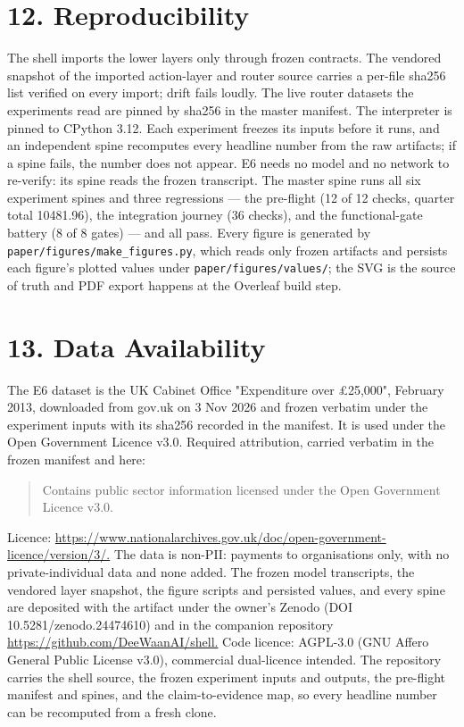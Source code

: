 \documentclass[11pt,a4paper]{article}
\begin{document}
\section*{12. Reproducibility}
The shell imports the lower layers only through frozen contracts. The vendored snapshot of the imported action-layer and router source carries a per-file sha256 list verified on every import; drift fails loudly. The live router datasets the experiments read are pinned by sha256 in the master manifest. The interpreter is pinned to CPython 3.12. Each experiment freezes its inputs before it runs, and an independent spine recomputes every headline number from the raw artifacts; if a spine fails, the number does not appear. E6 needs no model and no network to re-verify: its spine reads the frozen transcript. The master spine runs all six experiment spines and three regressions --- the pre-flight (12 of 12 checks, quarter total 10481.96), the integration journey (36 checks), and the functional-gate battery (8 of 8 gates) --- and all pass. Every figure is generated by \texttt{paper/figures/make\_figures.py}, which reads only frozen artifacts and persists each figure's plotted values under \texttt{paper/figures/values/}; the SVG is the source of truth and PDF export happens at the Overleaf build step.

\section*{13. Data Availability}
The E6 dataset is the UK Cabinet Office "Expenditure over \pounds{}25,000", February 2013, downloaded from gov.uk on 3 Nov 2026 and frozen verbatim under the experiment inputs with its sha256 recorded in the manifest. It is used under the Open Government Licence v3.0. Required attribution, carried verbatim in the frozen manifest and here:

\begin{quote}
Contains public sector information licensed under the Open Government Licence v3.0.
\end{quote}
Licence: \url{https://www.nationalarchives.gov.uk/doc/open-government-licence/version/3/.} The data is non-PII: payments to organisations only, with no private-individual data and none added. The frozen model transcripts, the vendored layer snapshot, the figure scripts and persisted values, and every spine are deposited with the artifact under the owner's Zenodo (DOI 10.5281/zenodo.24474610) and in the companion repository \url{https://github.com/DeeWaanAI/shell.} Code licence: AGPL-3.0 (GNU Affero General Public License v3.0), commercial dual-licence intended. The repository carries the shell source, the frozen experiment inputs and outputs, the pre-flight manifest and spines, and the claim-to-evidence map, so every headline number can be recomputed from a fresh clone.
\end{document}
